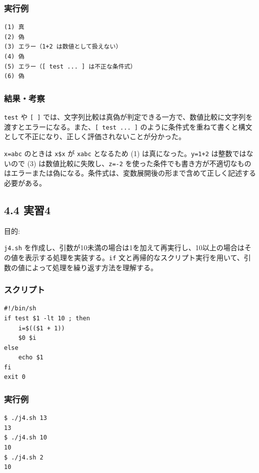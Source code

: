 \documentclass[12pt,a4paper]{jsarticle}
\begin{document}
\subsubsection*{実行例}
\begin{lstlisting}
(1) 真
(2) 偽
(3) エラー（1+2 は数値として扱えない）
(4) 偽
(5) エラー（[ test ... ] は不正な条件式）
(6) 偽
\end{lstlisting}

\subsubsection*{結果・考察}
\texttt{test} や \texttt{[ ]} では、文字列比較は真偽が判定できる一方で、数値比較に文字列を渡すとエラーになる。また、\texttt{[ test ... ]} のように条件式を重ねて書くと構文として不正になり、正しく評価されないことが分かった。\par

\texttt{x=abc} のときは \texttt{x\$x} が \texttt{xabc} となるため (1) は真になった。\texttt{y=1+2} は整数ではないので (3) は数値比較に失敗し、\texttt{z=-2} を使った条件でも書き方が不適切なものはエラーまたは偽になる。条件式は、変数展開後の形まで含めて正しく記述する必要がある。\par

\vspace{1.0cm}

\subsection*{4.4 実習4}

目的:\par
\texttt{j4.sh} を作成し、引数が10未満の場合は1を加えて再実行し、10以上の場合はその値を表示する処理を実装する。\texttt{if} 文と再帰的なスクリプト実行を用いて、引数の値によって処理を繰り返す方法を理解する。

\subsubsection*{スクリプト}
\begin{lstlisting}
#!/bin/sh
if test $1 -lt 10 ; then
    i=$(($1 + 1))
    $0 $i
else
    echo $1
fi
exit 0
\end{lstlisting}

\subsubsection*{実行例}
\begin{lstlisting}
$ ./j4.sh 13
13
$ ./j4.sh 10
10
$ ./j4.sh 2
10
\end{lstlisting}
\end{document}
